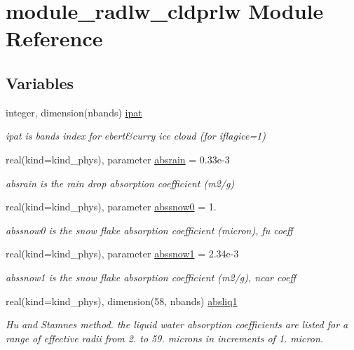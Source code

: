 \hypertarget{namespacemodule__radlw__cldprlw}{}\section{module\+\_\+radlw\+\_\+cldprlw Module Reference}
\label{namespacemodule__radlw__cldprlw}
\subsection*{Variables}
\begin{DoxyCompactItemize}
\item 
integer, dimension(nbands) \hyperlink{namespacemodule__radlw__cldprlw_a9e8ebd81d5d62c2be4c006a595493aed}{ipat}
\begin{DoxyCompactList}\small\item\em ipat is bands index for ebert\&curry ice cloud (for iflagice=1) \end{DoxyCompactList}\item 
real(kind=kind\+\_\+phys), parameter \hyperlink{group__module__radlw__main_ga04bff194fec27e0586ab1b4770319882}{absrain} = 0.\+33e-\/3
\begin{DoxyCompactList}\small\item\em absrain is the rain drop absorption coefficient (m2/g) \end{DoxyCompactList}\item 
real(kind=kind\+\_\+phys), parameter \hyperlink{group__module__radlw__main_ga4bcd58c6a7e9abdfbb8f8ec7d925d143}{abssnow0} = 1.
\begin{DoxyCompactList}\small\item\em abssnow0 is the snow flake absorption coefficient (micron), fu coeff \end{DoxyCompactList}\item 
real(kind=kind\+\_\+phys), parameter \hyperlink{group__module__radlw__main_ga7d12b328d9dec0c525a4b0824ae7ab44}{abssnow1} = 2.\+34e-\/3
\begin{DoxyCompactList}\small\item\em abssnow1 is the snow flake absorption coefficient (m2/g), ncar coeff \end{DoxyCompactList}\item 
real(kind=kind\+\_\+phys), dimension(58, nbands) \hyperlink{group__module__radlw__main_ga57896538226e9184c3750440d9f62166}{absliq1}
\begin{DoxyCompactList}\small\item\em Hu and Stamnes method. the liquid water absorption coefficients are listed for a range of effective radii from 2. to 59. microns in increments of 1. micron. \end{DoxyCompactList}\item 

\end{DoxyCompactItemize}
